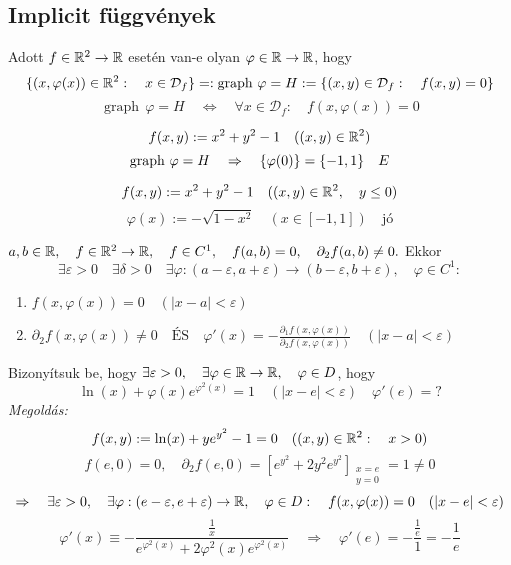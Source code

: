 \documentclass[a4paper,11.5pt]{article}
\DeclareMathOperator{\Graph}{graph}
\begin{document}
	\subsection{Implicit függvények}
	\begin{note}
		Adott $f\in\mathbb{R}^2\to\mathbb{R}$ esetén van-e olyan $\varphi\in\mathbb{R}\to\mathbb{R}$, hogy
		\[ \{ (x,\varphi(x))\in\R^2:\quad x\in\mathcal{D}_f \}=:\Graph\,\varphi=H:=\{ (x,y)\in\mathcal{D}_f:\quad f(x,y)=0 \} \]
		\[ \Graph\,\varphi=H\quad \Leftrightarrow\quad \forall x\in\mathcal{D}_f:\quad f(x,\varphi(x))=0 \]
	\end{note}
	\begin{example}
		\[ f(x,y):=x^2+y^2-1 \quad ((x,y)\in\mathbb{R}^2)\]
		\[ \Graph\,\varphi=H\quad \Rightarrow\quad \{ \varphi(0) \}=\{-1,1\}\quad \Lightning \]
	\end{example}
	\begin{example}
		\[ f(x,y):=x^2+y^2-1\quad ((x,y)\in\mathbb{R}^2,\quad y\leq 0) \]
		\[ \varphi(x):=-\sqrt{1-x^2}\quad (x\in[-1,1])\quad \text{jó} \]
	\end{example}
	\begin{theorem}
		$a,b\in\mathbb{R},\quad f\in\mathbb{R}^2\to\mathbb{R},\quad f\in C^1,\quad f(a,b)=0,\quad \partial_2f(a,b)\not=0.$ Ekkor
		\[ \exists \varepsilon>0\quad \exists\delta>0\quad \exists\varphi:(a-\varepsilon,a+\varepsilon)\to(b-\varepsilon,b+\varepsilon),\quad \varphi\in C^1: \]
		\begin{enumerate}
			\item 
			$ f(x,\varphi(x))=0\quad (|x-a|<\varepsilon) $
			\item $\partial_2f(x,\varphi(x))\not=0\quad \text{ÉS} \quad \varphi'(x)= -\frac{\partial_1f(x,\varphi(x))}{\partial_2f(x,\varphi(x))}\quad (|x-a|<\varepsilon)$
		\end{enumerate}
	\end{theorem}
	\begin{task}
		Bizonyítsuk be, hogy $\exists\varepsilon>0,\quad \exists\varphi\in\mathbb{R}\to\mathbb{R},\quad \varphi\in D$, hogy
		\[\ln(x)+\varphi(x)e^{\varphi^2(x)}=1\quad (|x-e|<\varepsilon)\quad \varphi'(e)=?\]
		\textit{Megoldás:}
		\[ f(x,y):=\ln(x)+ye^{y^2}-1=0\quad ((x,y)\in\mathbb{R}^2:\quad x>0) \]
		\[ f(e,0)=0,\quad \partial_2f(e,0)=\left[e^{y^2}+2y^2e^{y^2}\right]_{\substack{x=e\\y=0}}=1\not=0 \]
		\[ \Rightarrow\quad \exists\varepsilon>0,\quad \exists\varphi:(e-\varepsilon,e+\varepsilon)\to\mathbb{R},\quad \varphi\in D:\quad f(x,\varphi(x))=0\quad (|x-e|<\varepsilon) \]
		\[ \varphi'(x)\equiv -\frac{\frac{1}{x}}{e^{\varphi^2(x)}+2\varphi^2(x)e^{\varphi^2(x)}}\quad \Rightarrow\quad \varphi'(e)=-\frac{\frac{1}{e}}{1}=-\frac{1}{e} \]
	\end{task}
			
\end{document}
